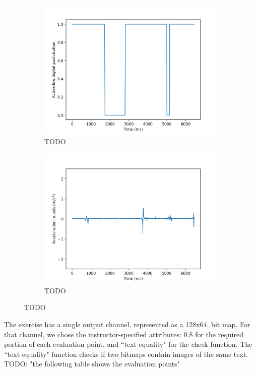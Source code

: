 \documentclass[12pt]{article}
\begin{document}
\begin{figure}[ht]
\begin{subfigure}[b]{.45\linewidth}
\includegraphics[width=\linewidth]{f1-button.png}
\caption{TODO}
\end{subfigure}
\begin{subfigure}[b]{.45\linewidth}
\includegraphics[width=\linewidth]{f1-acc.png}
\caption{TODO}
\end{subfigure}

\caption{TODO}
\label{fig:actual-input-frames}
\end{figure}


The exercise has a single output channel, represented as a 128x64, bit map.  For that channel, we chose the instructor-specified attributes: 0.8 for the required portion of each evaluation point, and ``text equality" for the check function.  The ``text equality" function checks if two bitmaps contain images of the same text.   TODO: "the following table shows the evaluation points"
\end{document}
